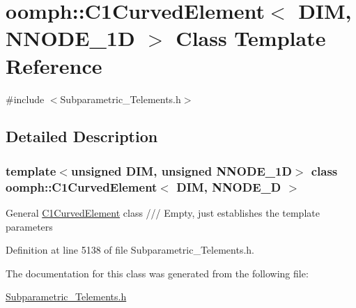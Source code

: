 \hypertarget{classoomph_1_1C1CurvedElement}{}\section{oomph\+:\+:C1\+Curved\+Element$<$ D\+IM, N\+N\+O\+D\+E\+\_\+1D $>$ Class Template Reference}
\label{classoomph_1_1C1CurvedElement}


{\ttfamily \#include $<$Subparametric\+\_\+\+Telements.\+h$>$}



\subsection{Detailed Description}
\subsubsection*{template$<$unsigned D\+IM, unsigned N\+N\+O\+D\+E\+\_\+1D$>$\newline
class oomph\+::\+C1\+Curved\+Element$<$ D\+I\+M, N\+N\+O\+D\+E\+\_\+D $>$}

General \hyperlink{classoomph_1_1C1CurvedElement}{C1\+Curved\+Element} class /// Empty, just establishes the template parameters 

Definition at line 5138 of file Subparametric\+\_\+\+Telements.\+h.



The documentation for this class was generated from the following file\+:\begin{DoxyCompactItemize}
\item 
\hyperlink{Subparametric__Telements_8h}{Subparametric\+\_\+\+Telements.\+h}\end{DoxyCompactItemize}

